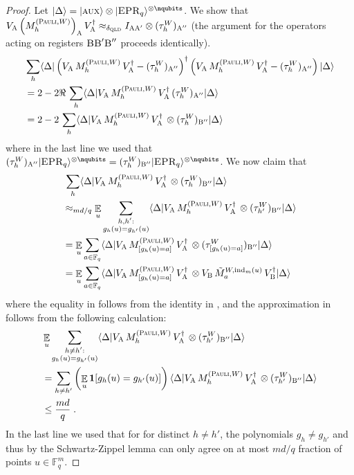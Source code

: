 \documentclass[11pt]{article}
\theoremstyle{definition}
\newcommand{\ket}[1]{|#1\rangle}
\newcommand{\bra}[1]{\langle#1|}
\newcommand{\Id}{\ensuremath{I}}
\newcommand{\F}{\ensuremath{\mathbb{F}}}
\newcommand{\ind}{\ensuremath{\mathrm{ind}}}
\newcommand{\E}{\mathop{\mathbb{E}}\displaylimits}
\newcommand{\gamestyle}[1]{\ensuremath{\textsc{#1}}\xspace}
\newcommand{\qld}{\gamestyle{QLD}}
\newcommand{\labelstyle}[1]{\ensuremath{\textsc{#1}}\xspace}
\newcommand{\EPR}{\labelstyle{EPR}}
\newcommand{\aux}{\labelstyle{aux}}
\newcommand{\alice}{\labelstyle{A}}
\newcommand{\bob}{\labelstyle{B}}
\newcommand{\typestyle}[1]{\ensuremath{\textsc{#1}}\xspace}
\newcommand{\Pauli}{\typestyle{Pauli}}
\begin{document}
\begin{proof}
	


Let $\ket{\Delta} = \ket{\aux} \otimes \ket{\EPR_q}^{\otimes \nqubits}$. We show that $V_\alice \, \Big(M^{(\Pauli,W)}_h \Big)_{\alice} \, V_\alice^\dagger \approx_{\delta_\qld} \Id_{\alice \alice'} \otimes (\tau^W_h)_{\alice''}$ (the argument for the operators acting on registers $\bob \bob' \bob''$ proceeds identically). 
	\begin{align}
		&\sum_h \bra{\Delta} \left ( V_\alice \, M^{(\Pauli,W)}_h \, V_\alice^\dagger - (\tau^W_h)_{\alice''}  \right)^\dagger \left ( V_\alice \, M^{(\Pauli,W)}_h \, V_\alice^\dagger - (\tau^W_h)_{\alice''} \right) \ket{\Delta} \notag \\
		&= 2 - 2 \Re \, \sum_h \bra{\Delta} V_\alice\, M^{(\Pauli,W)}_h \, V_\alice^\dagger  \, (\tau^W_h)_{\alice''} \ket{\Delta} \notag \\
		&= 2 - 2 \, \sum_h \bra{\Delta} V_\alice \, M^{(\Pauli,W)}_h \, V_\alice^\dagger  \, \otimes (\tau^W_h)_{\bob''} \ket{\Delta} \label{eq:qld-unitary-7}
\end{align}
	where in the last line we used that $(\tau^W_h)_{\alice''} \ket{\EPR_q}^{\otimes \nqubits} = (\tau^W_h)_{\bob''} \ket{\EPR_q}^{\otimes \nqubits}$.
	We now claim that
	\begin{align}
	&  \, \sum_h \bra{\Delta} V_\alice \, M^{(\Pauli,W)}_h \, V_\alice^\dagger  \, \otimes (\tau^W_h)_{\bob''} \ket{\Delta}  \notag \\
	&\approx_{md/q}  \E_u \sum_{\substack{h, h' : \\ g_h(u) = g_{h'}(u)}} \bra{\Delta} V_\alice \, M^{(\Pauli,W)}_h \, V_\alice^\dagger  \, \otimes (\tau^W_{h'})_{\bob''} \ket{\Delta} \label{eq:qld-unitary-8} \\
	&=  \E_u \sum_{a \in \F_q} \bra{\Delta} V_\alice \, M^{(\Pauli,W)}_{[g_h(u)=a]} \, V_\alice^\dagger \, \otimes (\tau^W_{[g_h(u)=a]})_{\bob''} \ket{\Delta} \notag \\
	&=  \E_u \sum_{a \in \F_q} \bra{\Delta} V_\alice \, M^{(\Pauli,W)}_{[g_h(u)=a]} \, V_\alice^\dagger \, \otimes V_\bob  \, \tilde{M}^{W,\ind_m(u)}_a \, V_\bob^\dagger \ket{\Delta} \label{eq:qld-unitary-9}
	\end{align}
	where the equality in  follows from the identity in , and the approximation in  follows from the following calculation:
	\begin{align*}
		& \E_u \sum_{\substack{h \neq h' : \\ g_h(u) = g_{h'}(u)}} \bra{\Delta} V_\alice \, M^{(\Pauli,W)}_h \, V_\alice^\dagger  \, \otimes (\tau^W_{h'})_{\bob''} \ket{\Delta}  \\
		&= \sum_{h \neq h'} \left( \E_u \mathbf{1}[g_h(u) = g_{h'}(u)] \right) \bra{\Delta} V_\alice \, M^{(\Pauli,W)}_h \, V_\alice^\dagger  \, \otimes (\tau^W_{h'})_{\bob''} \ket{\Delta} \\
		&\leq \frac{md}{q}\;.
	\end{align*}
	In the last line we used that for for distinct $h \neq h'$, the polynomials $g_h \neq g_{h'}$ and thus by the Schwartz-Zippel lemma can only agree on at most $md/q$ fraction of points $u \in \F_q^m$. 
	

\end{proof}
\end{document}

